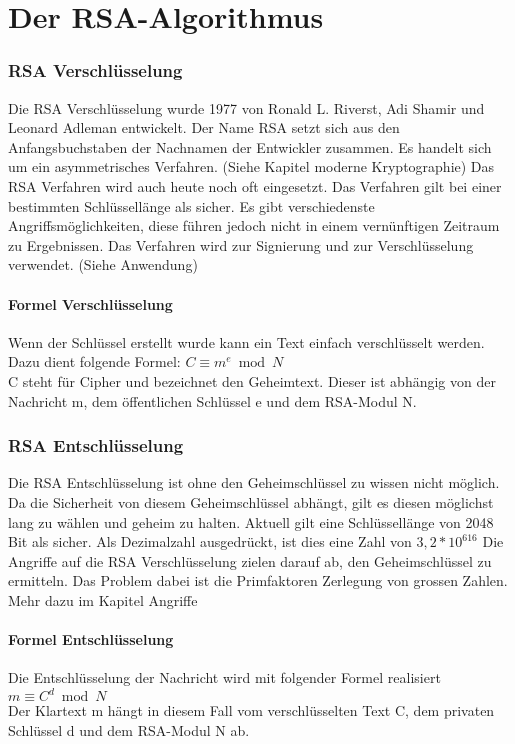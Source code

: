\part{Der RSA-Algorithmus}



\section{RSA Verschlüsselung}
Die RSA Verschlüsselung wurde 1977 von Ronald L. Riverst, Adi Shamir und Leonard Adleman entwickelt. Der Name RSA setzt sich aus den Anfangsbuchstaben der Nachnamen der Entwickler zusammen. Es handelt sich um ein asymmetrisches Verfahren. (Siehe Kapitel moderne Kryptographie) %
Das RSA Verfahren wird auch heute noch oft eingesetzt. Das Verfahren gilt bei einer bestimmten Schlüssellänge als sicher. Es gibt verschiedenste Angriffsmöglichkeiten, diese führen jedoch nicht in einem vernünftigen Zeitraum zu Ergebnissen. Das Verfahren wird zur Signierung und zur Verschlüsselung verwendet. (Siehe Anwendung) %

\subsection{Formel Verschlüsselung}
Wenn der Schlüssel erstellt wurde kann ein Text einfach verschlüsselt werden. Dazu dient folgende Formel:
$ C \equiv m^e  \bmod N $\\
C steht für Cipher und bezeichnet den Geheimtext. Dieser ist abhängig von der Nachricht m, dem öffentlichen Schlüssel e und dem RSA-Modul N.

\section{RSA Entschlüsselung}
Die RSA Entschlüsselung ist ohne den Geheimschlüssel zu wissen nicht möglich. Da die Sicherheit von diesem Geheimschlüssel abhängt, gilt es diesen möglichst lang zu wählen und geheim zu halten. Aktuell gilt eine Schlüssellänge von 2048 Bit als sicher. Als Dezimalzahl ausgedrückt, ist dies eine Zahl von $ 3,2 * 10^{616} $
Die Angriffe auf die RSA Verschlüsselung zielen darauf ab, den Geheimschlüssel zu ermitteln. Das Problem dabei ist die Primfaktoren Zerlegung von grossen Zahlen. Mehr dazu im Kapitel Angriffe %

\subsection{Formel Entschlüsselung}
Die Entschlüsselung der Nachricht wird mit folgender Formel realisiert
$ m \equiv C^d \bmod N $ \\
Der Klartext m hängt in diesem Fall vom verschlüsselten Text C, dem privaten Schlüssel d und dem RSA-Modul N ab. 
%
